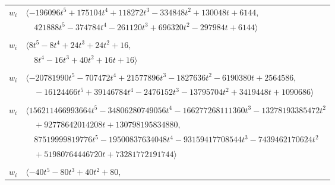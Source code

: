 \documentclass[11pt]{article}
\begin{document}
\begin{longtable}{@{}ll@{}}
$w_i$ & $\langle -196096t^{5}+175104t^{4}+118272t^{3}-334848t^{2}+130048t+6144,$\\
 & $\quad 421888t^{5}-374784t^{4}-261120t^{3}+696320t^{2}-297984t+6144\rangle$\\
\addlinespace[2pt]
\multicolumn{2}{@{}p{0.97\textwidth}@{}}{$i=38$, $D_i=4$, $e_i=2$, $\rho_{ij}$: $4{:}3, \allowbreak 5{:}1, \allowbreak 32{:}1, \allowbreak 45{:}1, \allowbreak 55{:}1, \allowbreak 63{:}2, \allowbreak 64{:}2, \allowbreak 71{:}1$}\\
$w_i$ & $\langle 8t^{5}-8t^{4}+24t^{3}+24t^{2}+16,$\\
 & $\quad 8t^{4}-16t^{3}+40t^{2}+16t+16\rangle$\\
\addlinespace[2pt]
\multicolumn{2}{@{}p{0.97\textwidth}@{}}{$i=39$, $D_i=628864$, $\rho_{ij}$: $5{:}2, \allowbreak 8{:}2, \allowbreak 17{:}2, \allowbreak 21{:}2, \allowbreak 22{:}2, \allowbreak 53{:}2, \allowbreak 63{:}2, \allowbreak 74{:}2, \allowbreak 75{:}2$}\\
$w_i$ & $\langle -20781990t^{5}-707472t^{4}+21577896t^{3}-1827636t^{2}-6190380t+2564586,$\\
 & $\quad -16124466t^{5}+39146784t^{4}-2476152t^{3}-13795704t^{2}+3419448t+1090686\rangle$\\
\addlinespace[2pt]
\multicolumn{2}{@{}p{0.97\textwidth}@{}}{$i=40$, $D_i=32768$, $e_i=2$, $\rho_{ij}$: $4{:}3, \allowbreak 5{:}2, \allowbreak 7{:}2, \allowbreak 10{:}2, \allowbreak 11{:}1, \allowbreak 13{:}3, \allowbreak 15{:}1, \allowbreak 21{:}3, \allowbreak 24{:}2, \allowbreak 25{:}3, \allowbreak 27{:}2, \allowbreak 33{:}3, \allowbreak 45{:}2, \allowbreak 52{:}3, \allowbreak 55{:}2, \allowbreak 60{:}2, \allowbreak 66{:}1, \allowbreak 73{:}3$}\\
$w_i$ & $\langle 156211466993664t^{5}-34806280749056t^{4}-166277268111360t^{3}-13278193385472t^{2}$\\
 & $\quad +92778642014208t+130798195834880,$\\
 & $\quad 87519999819776t^{5}-19500837634048t^{4}-93159417708544t^{3}-7439462170624t^{2}$\\
 & $\quad +51980764446720t+73281772191744\rangle$\\
\addlinespace[2pt]
\multicolumn{2}{@{}p{0.97\textwidth}@{}}{$i=41$, $D_i=10$, $e_i=2$, $\rho_{ij}$: $0{:}1, \allowbreak 3{:}1, \allowbreak 4{:}2, \allowbreak 5{:}1, \allowbreak 6{:}2, \allowbreak 13{:}1, \allowbreak 61{:}3, \allowbreak 74{:}3$}\\
$w_i$ & $\langle -40t^{5}-80t^{3}+40t^{2}+80,$\\

\end{longtable}
\end{document}
